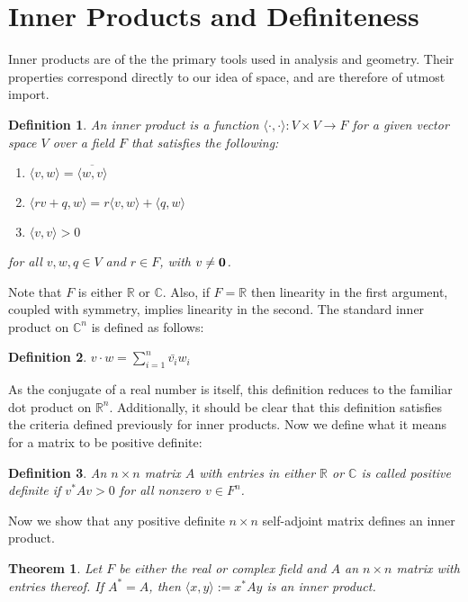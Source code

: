 \documentclass{article}
\newtheorem{defn}{Definition}
\newtheorem{thm}{Theorem}
\begin{document}
\section{Inner Products and Definiteness}
Inner products are of the the primary tools used in analysis and geometry. Their properties correspond directly to our idea of space, and are therefore of utmost import.
\begin{defn}
	An inner product is a function $\langle \cdot, \cdot \rangle : V \times V \to F$ for a given vector space $V$ over a field $F$ that satisfies the following:
\begin{enumerate}
\item $\langle v, w \rangle=\overline{\langle w, v \rangle}$
\item $\langle rv+q, w \rangle=r\langle v, w \rangle + \langle q, w \rangle$
\item $\langle v, v \rangle>0$
\end{enumerate}
	for all $v,w,q \in V$ and $r \in F$, with $v \neq \bold{0}$.  
\end{defn}
Note that $F$ is either $\mathbb{R}$ or $\mathbb{C}$. Also, if $F=\mathbb{R}$ then linearity in the first argument, coupled with symmetry, implies linearity in the second. The standard inner product on $\mathbb{C}^n$ is defined as follows:
\begin{defn}
	$ v \cdot w =\sum\limits_{i=1}^n \bar{v_i}w_i$ 
\end{defn}
As the conjugate of a real number is itself, this definition reduces to the familiar dot product on $\mathbb{R}^n$. Additionally, it should be clear that this definition satisfies the criteria defined previously for inner products. 
Now we define what it means for a matrix to be positive definite: 
\begin{defn}
	An $n \times n$  matrix $A$ with entries in either $\mathbb{R}$ or $\mathbb{C}$ is called positive definite if 
$v^*Av > 0$ for all nonzero $v \in F^n$. 
\end{defn}
Now we show that any positive definite $n \times n$ self-adjoint matrix defines an inner product. 
\begin{thm}
	Let $F$ be either the real or complex field and $A$ an $n \times n$ matrix with entries thereof. If $A^*=A$, then $\langle x, y \rangle:=x^*Ay$ is an inner product.
\end{thm}
\end{document}
